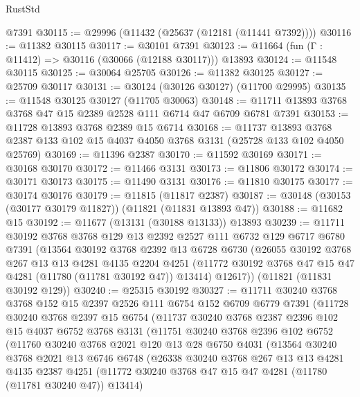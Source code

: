 \begin{lexlean}{RustStd}
\begin{coremodule}
    @7391
@30115 := @29996 (@11432 (@25637 (@12181 (@11441 @7392))))
@30116 := @11382 @30115
@30117 := @30101 @7391
@30123 := @11664 (fun (Γ : @11412) => @30116 (@30066 (@12188 @30117))) @13893
@30124 := @11548 @30115
@30125 := @30064 @25705
@30126 := @11382 @30125
@30127 := @25709 @30117
@30131 := @30124 (@30126 @30127) (@11700 @29995)
@30135 := @11548 @30125 @30127 (@11705 @30063)
@30148 := @11711 @13893 @3768 @3768 @47 @15 @2389 @2528 @111 @6714 @47 @6709 @6781 @7391
@30153 := @11728 @13893 @3768 @2389 @15 @6714
@30168 := @11737
    @13893
    @3768
    @2387
    @133
    @102
    @15
    @4037
    @4050
    @3768
    @3131
    (@25728 @133 @102 @4050 @25769)
@30169 := @11396 @2387
@30170 := @11592 @30169
@30171 := @30168 @30170
@30172 := @11466 @3131
@30173 := @11806 @30172
@30174 := @30171 @30173
@30175 := @11490 @3131
@30176 := @11810 @30175
@30177 := @30174 @30176
@30179 := @11815 (@11817 @2387)
@30187 := @30148 (@30153 (@30177 @30179 @11827)) (@11821 (@11831 @13893 @47))
@30188 := @11682 @15
@30192 := @11677 (@13131 (@30188 @13133)) @13893
@30239 := @11711
    @30192
    @3768
    @3768
    @129
    @13
    @2392
    @2527
    @111
    @6732
    @129
    @6717
    @6780
    @7391
    (@13564
      @30192
      @3768
      @2392
      @13
      @6728
      @6730
      (@26055
        @30192
        @3768
        @267
        @13
        @13
        @4281
        @4135
        @2204
        @4251
        (@11772 @30192 @3768 @47 @15 @47 @4281 (@11780 (@11781 @30192 @47)) @13414)
        @12617))
    (@11821 (@11831 @30192 @129))
@30240 := @25315 @30192
@30327 := @11711
    @30240
    @3768
    @3768
    @152
    @15
    @2397
    @2526
    @111
    @6754
    @152
    @6709
    @6779
    @7391
    (@11728
      @30240
      @3768
      @2397
      @15
      @6754
      (@11737
        @30240
        @3768
        @2387
        @2396
        @102
        @15
        @4037
        @6752
        @3768
        @3131
        (@11751
          @30240
          @3768
          @2396
          @102
          @6752
          (@11760
            @30240
            @3768
            @2021
            @120
            @13
            @28
            @6750
            @4031
            (@13564
              @30240
              @3768
              @2021
              @13
              @6746
              @6748
              (@26338
                @30240
                @3768
                @267
                @13
                @13
                @4281
                @4135
                @2387
                @4251
                (@11772 @30240 @3768 @47 @15 @47 @4281 (@11780 (@11781 @30240 @47)) @13414)

\end{coremodule}
\end{lexlean}
